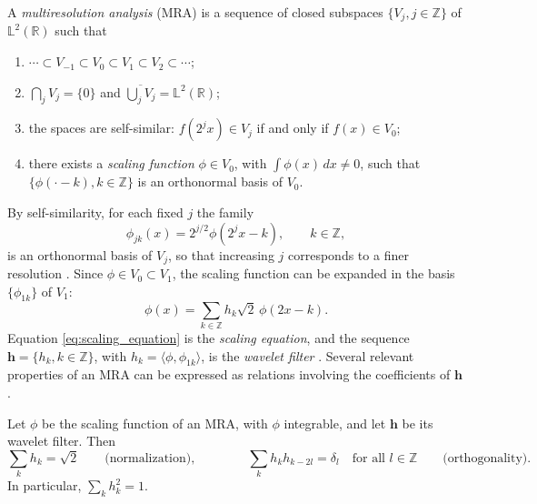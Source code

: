 \begin{definition}
\label{def:mra}
A \emph{multiresolution analysis} (MRA) is a sequence of closed subspaces
$\{V_j, j\in\mathbb{Z}\}$ of $\mathbb{L}^2(\mathbb{R})$ such that
\begin{enumerate}
\item $\cdots\subset V_{-1}\subset V_0\subset V_1\subset V_2\subset\cdots$;
\item $\bigcap_jV_j = \{0\}$ and $\overline{\bigcup_jV_j} =
\mathbb{L}^2(\mathbb{R})$;
\item the spaces are self-similar: $f(2^jx)\in V_j$ if and only if
$f(x)\in V_0$;
\item there exists a \emph{scaling function} $\phi\in V_0$, with
$\int\phi(x)\,dx\neq 0$, such that $\{\phi(\cdot-k), k\in\mathbb{Z}\}$ is an
orthonormal basis of $V_0$.
\end{enumerate}
\end{definition}

By self-similarity, for each fixed $j$ the family
\begin{equation}
\phi_{jk}(x) = 2^{j/2}\phi(2^jx-k),\qquad k\in\mathbb{Z},
\label{eq:phi_jk}
\end{equation}
is an orthonormal basis of $V_j$, so that increasing $j$ corresponds to a
finer resolution \cite[Sec.~3.3]{vidakovic1999}. Since $\phi\in V_0\subset
V_1$, the scaling function can be expanded in the basis
$\{\phi_{1k}\}$ of $V_1$:
\begin{equation}
\phi(x) = \sum_{k\in\mathbb{Z}}h_k\sqrt{2}\,\phi(2x-k).
\label{eq:scaling_equation}
\end{equation}
Equation \eqref{eq:scaling_equation} is the \emph{scaling equation}, and the
sequence $\mathbf{h} = \{h_k, k\in\mathbb{Z}\}$, with
$h_k = \langle\phi,\phi_{1k}\rangle$, is the \emph{wavelet filter}
\cite[Sec.~3.3]{vidakovic1999}. Several relevant properties of an MRA can be expressed as relations
involving the coefficients of $\mathbf{h}$ \cite[Sec.~3.5.5]{vidakovic1999}.

\begin{proposition}
\label{prop:filter_properties}
Let $\phi$ be the scaling function of an MRA, with $\phi$ integrable, and
let $\mathbf{h}$ be its wavelet filter. Then
\begin{equation}
\sum_kh_k = \sqrt{2}\qquad\text{(normalization)},\qquad\qquad
\sum_kh_kh_{k-2l} = \delta_l\quad\text{for all }l\in\mathbb{Z}
\qquad\text{(orthogonality)}.
\label{eq:filter_properties}
\end{equation}
In particular, $\sum_kh_k^2 = 1$.
\end{proposition}

